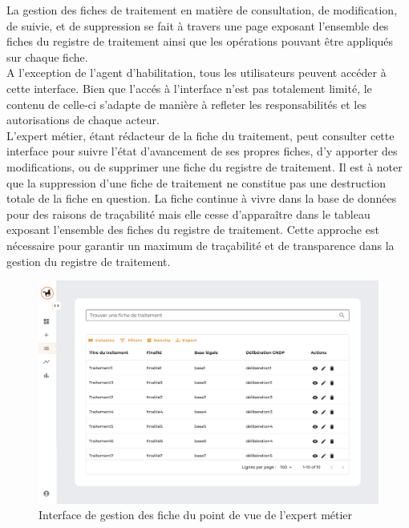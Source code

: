 La gestion des fiches de traitement en matière de consultation, de modification, de suivie, et de suppression se fait à travers une page exposant l'ensemble des fiches du registre de traitement ainsi que les opérations pouvant être appliqués sur chaque fiche. \\

\noindent A l'exception de l'agent d'habilitation, tous les utilisateurs peuvent accéder à cette interface. Bien que l'accés à l'interface n'est pas totalement limité, le contenu de celle-ci s'adapte de manière à refleter les responsabilités et les autorisations de chaque acteur. \\

\noindent L'expert métier, étant rédacteur de la fiche du traitement, peut consulter cette interface pour suivre l'état d'avancement de ses propres fiches, d'y apporter des modifications, ou de supprimer une fiche du registre de traitement. Il est à noter que la suppression d'une fiche de traitement ne constitue pas une destruction totale de la fiche en question. La fiche continue à vivre dans la base de données pour des raisons de traçabilité mais elle cesse d'apparaître dans le tableau exposant l'ensemble des fiches du registre de traitement. Cette approche est nécessaire pour garantir un maximum de traçabilité et de transparence dans la gestion du registre de traitement. \\

\begin{figure}[H]
    \centering
    \includegraphics[width=\textwidth]{images/guis/fiches/fiches-em.png}
    \caption{Interface de gestion des fiche du point de vue de l'expert métier}
\end{figure}


